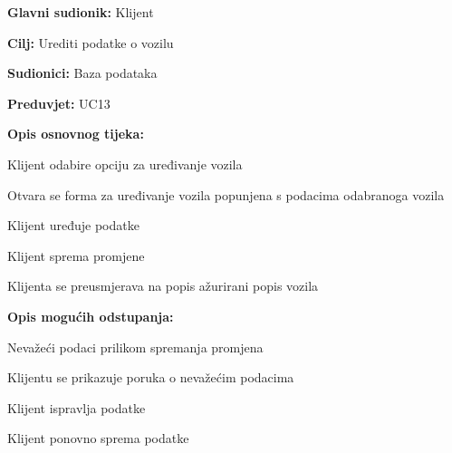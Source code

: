 \noindent {}
\begin{packed_item}
	
	\item \textbf{Glavni sudionik:} Klijent
	\item \textbf{Cilj:} Urediti podatke o vozilu
	\item \textbf{Sudionici:} Baza podataka
	\item \textbf{Preduvjet:} UC13
	\item \textbf{Opis osnovnog tijeka:}
	
	\item[] \begin{packed_enum}
		
		\item Klijent odabire opciju za uređivanje vozila
		\item Otvara se forma za uređivanje vozila popunjena s podacima odabranoga vozila
		\item Klijent uređuje podatke
		\item Klijent sprema promjene
		\item Klijenta se preusmjerava na popis ažurirani popis vozila
	
	\end{packed_enum}
	
	\item  \textbf{Opis mogućih odstupanja:}
	
	\item[] \begin{packed_item}
		
		\item[3.a] Nevažeći podaci prilikom spremanja promjena
		\item[] \begin{packed_enum}
			
			\item Klijentu se prikazuje poruka o nevažećim podacima
			\item Klijent ispravlja podatke
			\item Klijent ponovno sprema podatke
			
		\end{packed_enum}
		
	\end{packed_item}

\end{packed_item}

